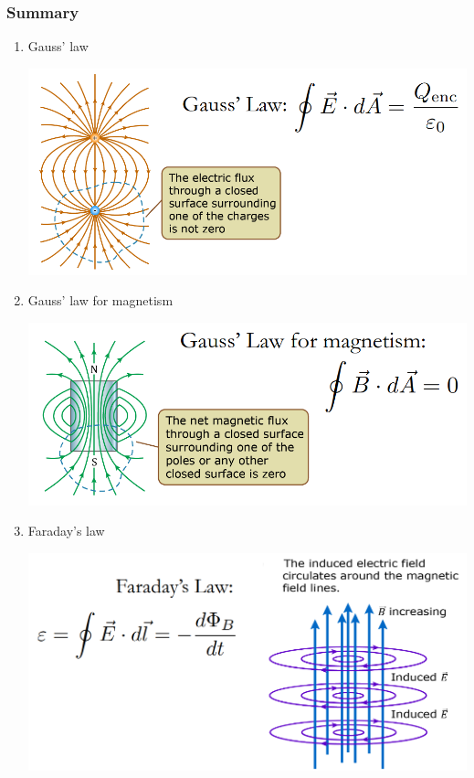 \documentclass[11pt]{article}
\begin{document}
\newpage

\subsubsection{Summary}
\label{sec:org716fa91}

\begin{enumerate}
\item Gauss' law
\label{sec:org47a4a46}
\begin{center}
\includegraphics[width=.9\linewidth]{./images/gauss-law.png}
\end{center}

\item Gauss' law for magnetism
\label{sec:org5ffc25e}
\begin{center}
\includegraphics[width=.9\linewidth]{./images/gauss-law-for-magnetism.png}
\end{center}

\item Faraday's law
\label{sec:org600b413}
\begin{center}
\includegraphics[width=.9\linewidth]{./images/faradays-law.png}
\end{center}


\end{enumerate}
\end{document}
